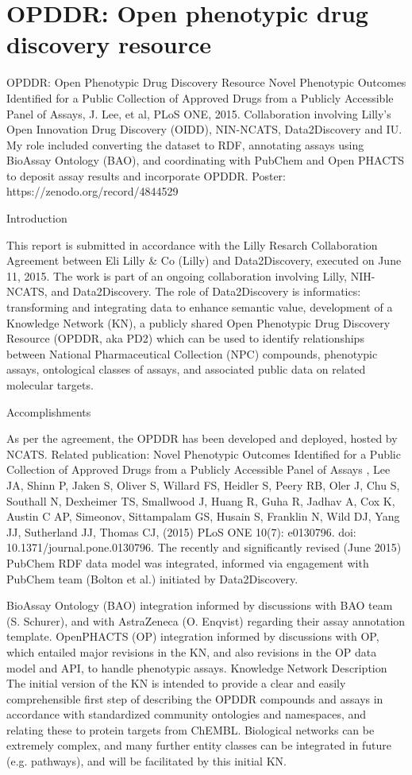 \section{OPDDR: Open phenotypic drug discovery resource}

OPDDR: Open Phenotypic Drug Discovery Resource
Novel Phenotypic Outcomes Identified for a Public Collection of Approved Drugs from a Publicly Accessible Panel of Assays, J. Lee, et al, PLoS ONE, 2015.
Collaboration involving Lilly's Open Innovation Drug Discovery (OIDD), NIN-NCATS, Data2Discovery and IU.  
My role included converting the dataset to RDF,  annotating assays using BioAssay Ontology (BAO), and coordinating with PubChem and Open PHACTS to deposit assay results and incorporate OPDDR.
Poster: https://zenodo.org/record/4844529

Introduction

This report is submitted in accordance with the Lilly Resarch Collaboration Agreement between Eli Lilly \& Co (Lilly) and Data2Discovery, executed on June 11, 2015.  The work is part of an ongoing collaboration involving Lilly, NIH-NCATS, and Data2Discovery.  The role of Data2Discovery is informatics: transforming and integrating data to enhance semantic value, development of a Knowledge Network (KN), a publicly shared Open Phenotypic Drug Discovery Resource (OPDDR, aka PD2) which can be used to identify relationships between National Pharmaceutical Collection (NPC) compounds, phenotypic assays, ontological classes of assays, and associated public data on related molecular targets.

Accomplishments

As per the agreement, the OPDDR has been developed and deployed, hosted by NCATS. 
Related publication: Novel Phenotypic Outcomes Identified for a Public Collection of Approved Drugs from a Publicly Accessible Panel of Assays , Lee JA, Shinn P, Jaken S, Oliver S, Willard FS, Heidler S, Peery RB, Oler J, Chu S, Southall N, Dexheimer TS, Smallwood J, Huang R, Guha R, Jadhav A, Cox K, Austin C AP, Simeonov, Sittampalam GS, Husain S, Franklin N, Wild DJ, Yang JJ, Sutherland JJ, Thomas CJ, (2015) PLoS ONE 10(7): e0130796. doi: 10.1371/journal.pone.0130796.
The recently and significantly revised (June 2015) PubChem RDF data model was integrated, informed via engagement with PubChem team (Bolton et al.) initiated by Data2Discovery.

BioAssay Ontology (BAO) integration informed by discussions with BAO team (S. Schurer), and with AstraZeneca (O. Enqvist) regarding their assay annotation template. 
OpenPHACTS (OP) integration informed by discussions with OP, which entailed major revisions in the KN, and also revisions in the OP data model and API, to handle phenotypic assays. 
Knowledge Network Description
The initial version of the KN is intended to provide a clear and easily comprehensible first step of describing the OPDDR compounds and assays in accordance with standardized community ontologies and namespaces, and relating these to protein targets from ChEMBL.  Biological networks can be extremely complex, and many further entity classes can be integrated in future (e.g. pathways), and will be facilitated by this initial KN.


